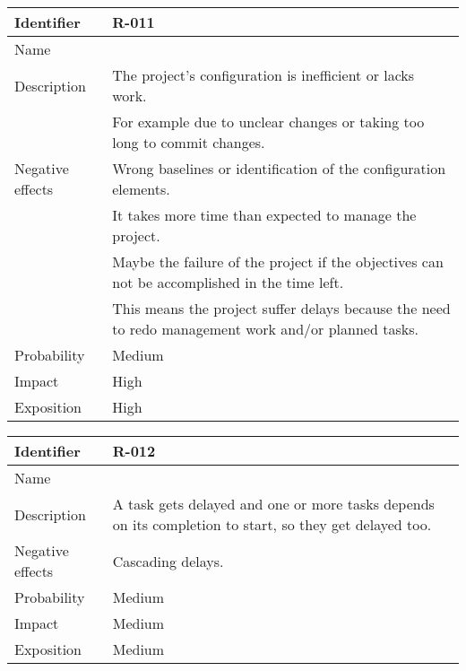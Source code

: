 \begin{table}[H]
	\begin{tabularx}{\textwidth}{|l|X|}
		\hline
		\rowcolor{gray!30}
		Identifier & \textbf{R-011} \\ \hline
		Name & \Ronce \\ \hline
		Description
			& The project's configuration is inefficient or lacks work. \\
			& For example due to unclear changes or taking too long to commit changes. \\ \hline
		Negative effects
			& Wrong baselines or identification of the configuration elements. \\
			& It takes more time than expected to manage the project. \\
			& Maybe the failure of the project if the objectives can not be accomplished in the time left. \\
			& This means the project suffer delays because the need to redo management work and/or planned tasks. \\ \hline
		Probability & Medium\\ \hline
		Impact &  High\\ \hline
		Exposition &  High\\ \hline
	\end{tabularx}
\end{table}

\begin{table}[H]
	\begin{tabularx}{\textwidth}{|l|X|}
		\hline
		\rowcolor{gray!30}
		Identifier & \textbf{R-012} \\ \hline
		Name & \Rdoce \\ \hline
		Description & A task gets delayed and one or more tasks depends on its completion to start, so they get delayed too.\\ \hline
		Negative effects
			& Cascading delays. \\ \hline
		Probability & Medium\\ \hline
		Impact &  Medium\\ \hline
		Exposition &  Medium\\ \hline
	\end{tabularx}
\end{table}

